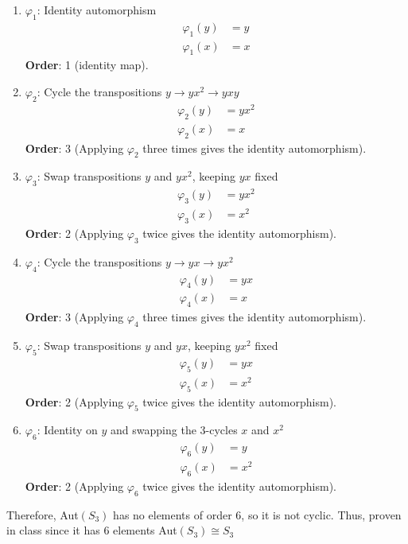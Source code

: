 \documentclass[12pt, letterpaper]{article}
\theoremstyle{definition}
\begin{document}
\begin{enumerate}
    \item \(\varphi_1\): Identity automorphism
    \begin{align*}
    \varphi_1(y) &= y \\
    \varphi_1(x) &= x
    \end{align*}
    \textbf{Order}: 1 (identity map).
    
    \item \(\varphi_2\): Cycle the transpositions \( y \rightarrow yx^2 \rightarrow yxy \)
    \begin{align*}
    \varphi_2(y) &= yx^2 \\
    \varphi_2(x) &= x
    \end{align*}
    \textbf{Order}: 3 (Applying \( \varphi_2 \) three times gives the identity automorphism).
    
    \item \(\varphi_3\): Swap transpositions \( y \) and \( yx^2 \), keeping \( yx \) fixed
    \begin{align*}
    \varphi_3(y) &= yx^2 \\
    \varphi_3(x) &= x^2
    \end{align*}
    \textbf{Order}: 2 (Applying \( \varphi_3 \) twice gives the identity automorphism).
    
    \item \(\varphi_4\): Cycle the transpositions \( y \rightarrow yx \rightarrow yx^2 \)
    \begin{align*}
    \varphi_4(y) &= yx \\
    \varphi_4(x) &= x
    \end{align*}
    \textbf{Order}: 3 (Applying \( \varphi_4 \) three times gives the identity automorphism).
    
    \item \(\varphi_5\): Swap transpositions \( y \) and \( yx \), keeping \( yx^2 \) fixed
    \begin{align*}
    \varphi_5(y) &= yx \\
    \varphi_5(x) &= x^2
    \end{align*}
    \textbf{Order}: 2 (Applying \( \varphi_5 \) twice gives the identity automorphism).
    
    \item \(\varphi_6\): Identity on \( y \) and swapping the 3-cycles \( x \) and \( x^2 \)
    \begin{align*}
    \varphi_6(y) &= y \\
    \varphi_6(x) &= x^2
    \end{align*}
    \textbf{Order}: 2 (Applying \( \varphi_6 \) twice gives the identity automorphism).
\end{enumerate}
Therefore, Aut$(S_3)$ has no elements of order 6, so it is not cyclic. Thus, proven in class since it has 6 elements Aut$(S_3) \cong S_3$
\end{document}
